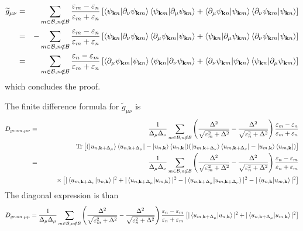 \documentclass[onecolumn, prb,preprintnumbers,amsmath,amssymb,floatfix]{revtex4}
\newcommand{\vk}{{\mathbf{k}}}
\newcommand{\Tr}{\mathrm{Tr}} \newcommand{\npsi}{\underline{\psi}}
\newcommand{\cb}{{\cal B}}
\begin{document}
\begin{eqnarray}
  \widetilde{g}_{\mu\nu}&=&  \sum_{m\in\cb,n\notin\cb}
  \frac{\varepsilon_m-\varepsilon_n}{\varepsilon_m+\varepsilon_n}
  \left[
   \braket{\psi_{\vk n}|\partial_\nu \psi_{\vk m}}\braket{\psi_{\vk m}|\partial_\mu\psi_{\vk n}}+
   \braket{\partial_\mu\psi_{\vk n}|\psi_{\vk m}}\braket{\partial_\nu \psi_{\vk m}|\psi_{\vk n}}
  \right]
\nonumber\\
&=&  -\sum_{m\in\cb,n\notin\cb}
  \frac{\varepsilon_m-\varepsilon_n}{\varepsilon_m+\varepsilon_n}
  \left[
   \braket{\psi_{\vk n}|\partial_\nu \psi_{\vk m}}\braket{\partial_\mu\psi_{\vk m}|\psi_{\vk n}}+
   \braket{\psi_{\vk n}|\partial_\mu\psi_{\vk m}}\braket{\partial_\nu \psi_{\vk m}|\psi_{\vk n}}
  \right]  
\nonumber\\
&=&  \sum_{m\in\cb,n\notin\cb}
  \frac{\varepsilon_n-\varepsilon_m}{\varepsilon_m+\varepsilon_n}
  \left[
   \braket{\partial_\mu\psi_{\vk m}|\psi_{\vk n}}\braket{\psi_{\vk n}|\partial_\nu \psi_{\vk m}}+
   \braket{\partial_\nu \psi_{\vk m}|\psi_{\vk n}}\braket{\psi_{\vk n}|\partial_\mu\psi_{\vk m}}
  \right]  
\end{eqnarray}  
which concludes the proof.

The finite difference formula for $\widetilde{g}_{\mu\nu}$ is
\begin{eqnarray}
D_{geom,\mu\nu}&=&
                   \frac{1}{\Delta_\mu\Delta_\nu}\sum_{m\in\cb,n\notin\cb}
\left( \frac{\Delta^2}{\sqrt{\varepsilon_m^2+\Delta^2}}-
  \frac{\Delta^2}{\sqrt{\varepsilon_n^2+\Delta^2}}
  \right)
  \frac{\varepsilon_m-\varepsilon_n}{\varepsilon_m+\varepsilon_n}
  \\                 
  &&\qquad \Tr\left[
  (\ket{u_{n,\vk+\Delta_\mu}}\bra{u_{n,\vk+\Delta_\mu}}-\ket{u_{n,\vk}}\bra{u_{n,\vk}})
  (\ket{u_{m,\vk+\Delta_\nu}}\bra{u_{m,\vk+\Delta_\nu}}-\ket{u_{m,\vk}}\bra{u_{m,\vk}})
  \right] \nonumber\\
&=&\frac{1}{\Delta_\mu\Delta_\nu}
    \sum_{m\in\cb,n\notin\cb}
\left( \frac{\Delta^2}{\sqrt{\varepsilon_m^2+\Delta^2}}-
  \frac{\Delta^2}{\sqrt{\varepsilon_n^2+\Delta^2}}
  \right)
    \frac{\varepsilon_n-\varepsilon_m}{\varepsilon_n+\varepsilon_m}\\
  &&
  \qquad\times\left[
    |\braket{u_{m,\vk+\Delta_\nu}|u_{n,\vk}}|^2
    +|\braket{u_{n,\vk+\Delta_\mu}|u_{m,\vk}}|^2
    -|\braket{u_{n,\vk+\Delta_\mu}|u_{m,\vk+\Delta_\nu}}|^2
    -|\braket{u_{n,\vk}|u_{m,\vk}}|^2
  \right]
\nonumber
\end{eqnarray}  
The diagonal expression is than
\begin{eqnarray}
  D_{geom,\mu\mu}=
\frac{1}{\Delta_\mu\Delta_\mu}
  \sum_{m\in\cb,n\notin\cb}
\left( \frac{\Delta^2}{\sqrt{\varepsilon_m^2+\Delta^2}}-
  \frac{\Delta^2}{\sqrt{\varepsilon_n^2+\Delta^2}}
  \right)
  \frac{\varepsilon_n-\varepsilon_m}{\varepsilon_n+\varepsilon_m}
  \left[
    |\braket{u_{m,\vk+\Delta_\mu}|u_{n,\vk}}|^2
    +|\braket{u_{n,\vk+\Delta_\mu}|u_{m,\vk}}|^2
  \right]
\end{eqnarray}  
\end{document}

